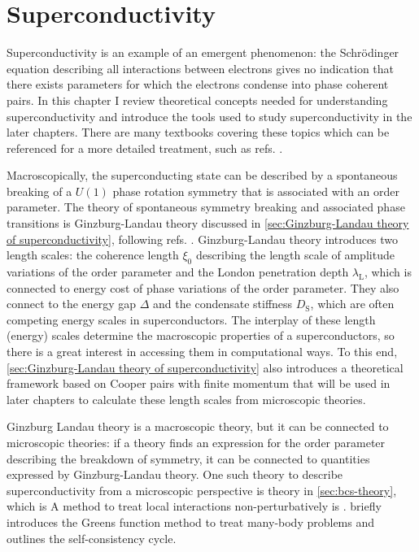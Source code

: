\documentclass[../notes.tex]{subfiles}
\begin{document}
\raggedbottom

\chapter{Superconductivity}\label{ch:superconductivity}

Superconductivity is an example of an emergent phenomenon: the Schrödinger equation describing all interactions between electrons gives no indication that there exists parameters for which the electrons condense into phase coherent pairs.
In this chapter I review theoretical concepts needed for understanding superconductivity and introduce the tools used to study superconductivity in the later chapters.
There are many textbooks covering these topics which can be referenced for a more detailed treatment, such as refs. \cite{colemanIntroductionManyBodyPhysics2015, tinkhamIntroductionSuperconductivity1996, bruusManyBodyQuantumTheory2004, larkinTheoryFluctuationsSuperconductors2005, bennemannSuperconductivity2008}.

Macroscopically, the superconducting state can be described by a spontaneous breaking of a \(U(1)\) phase rotation symmetry that is associated with an order parameter.
The theory of spontaneous symmetry breaking and associated phase transitions is Ginzburg-Landau theory discussed in \cref{sec:Ginzburg-Landau theory of superconductivity}, following refs. \cite{beekmanIntroductionSpontaneousSymmetry2019, colemanIntroductionManyBodyPhysics2015}.
Ginzburg-Landau theory introduces two length scales: the coherence length \(\xi_0\) describing the length scale of amplitude variations of the order parameter and the London penetration depth \(\lambda_{\mathrm{L}}\), which is connected to energy cost of phase variations of the order parameter.
They also connect to the energy gap \(\Delta\) and the condensate stiffness \(D_{\mathrm{S}}\), which are often competing energy scales in superconductors.
The interplay of these length (energy) scales determine the macroscopic properties of a superconductors, so there is a great interest in accessing them in computational ways.
To this end, \cref{sec:Ginzburg-Landau theory of superconductivity} also introduces a theoretical framework based on Cooper pairs with finite momentum \cite{wittBypassingLatticeBCS2024} that will be used in later chapters to calculate these length scales from microscopic theories.

Ginzburg Landau theory is a macroscopic theory, but it can be connected to microscopic theories: if a theory finds an expression for the order parameter describing the breakdown of symmetry, it can be connected to quantities expressed by Ginzburg-Landau theory.
One such theory to describe superconductivity from a microscopic perspective is  theory in \cref{sec:bcs-theory}, which is 
A method to treat local interactions non-perturbatively is .  briefly introduces the Greens function method to treat many-body problems and outlines the  self-consistency cycle.
\end{document}
